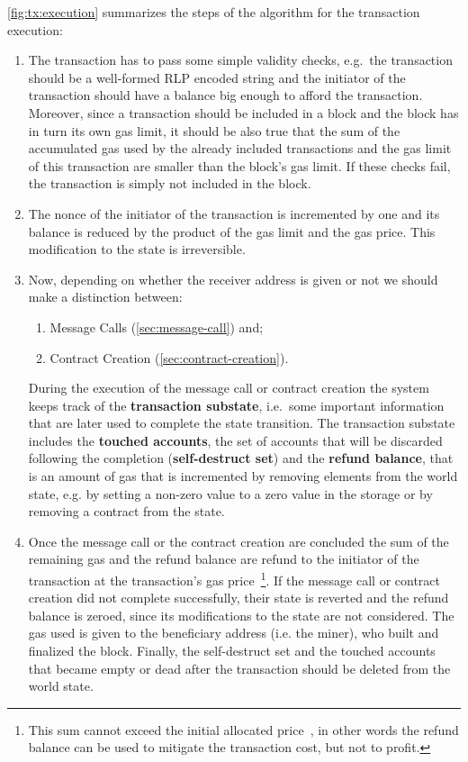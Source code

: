 \autoref{fig:tx:execution} summarizes the steps of the algorithm for the 
transaction execution:
\begin{enumerate}
	\item The transaction has to pass some simple validity checks, e.g.\ the
	transaction should be a well-formed RLP encoded string and the initiator
	of the transaction should have a balance big enough to afford the 
	transaction.
	Moreover, since a transaction should be included in a block and the block
	has in turn its own gas limit, it should be also true that the sum 
	of the accumulated gas used by the already included transactions and the gas
	limit of this transaction are smaller than the block's gas limit.
	If these checks fail, the transaction is simply not included in the block.
	
	
	\item The nonce of the initiator of the transaction is incremented by one and its balance is reduced by the product of the gas limit and the gas price. This modification to the state is irreversible.
	\item Now, depending on whether the receiver address is given or not
	we should make a distinction between:
	\begin{enumerate}[label=\alph*.]
		\item Message Calls (\autoref{sec:message-call}) and;
		\item Contract Creation (\autoref{sec:contract-creation}).
	\end{enumerate}
	During the execution of the message call or contract creation the system
	keeps track of the \textbf{transaction substate}, i.e.\ some important
	information that are later used to complete the state transition.
	The transaction substate includes the \textbf{touched accounts}, the set of
	accounts that will be discarded following the completion 
	(\textbf{self-destruct set}) and the
	\textbf{refund balance}, that is an amount of gas that is incremented by
	removing elements from the world state, e.g. by setting a non-zero value to
	a zero value in the storage or by removing a contract from the state.
	
	\item Once the message call or the contract creation are concluded
	the sum of the remaining gas and the refund balance are refund
	to the initiator of the transaction at the transaction's gas price~\footnote{This sum cannot exceed the initial allocated
	price~\cite{wood2018ethereum}, in other words the refund balance can be 
	used to mitigate the transaction cost, but not to profit.}.
	If the message call or contract creation did not complete successfully,
	their state is reverted and the refund balance is zeroed, since its
	modifications to the state are not considered.
	The gas used is given to the beneficiary address (i.e. the miner), who
	built and finalized the block. Finally, the self-destruct set and the
	touched accounts that became empty or dead after the transaction should
	be deleted from the world  state.
\end{enumerate}
 

